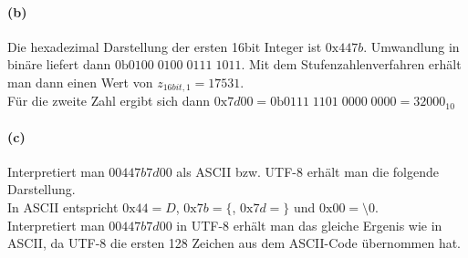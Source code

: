 \documentclass[a4paper]{article}
\begin{document}
\paragraph{(b)}
Die hexadezimal Darstellung der ersten 16bit Integer ist $0\text{x}447b$. Umwandlung in binäre liefert dann $0\text{b}0100\;0100\;0111\;1011$. Mit dem Stufenzahlenverfahren erhält man dann einen Wert von $z_{16bit,1}=17531$.\\
Für die zweite Zahl ergibt sich dann $0\text{x}7d00=0\text{b}0111\;1101\;0000\;0000=32000_{10}$


\paragraph{(c)}
Interpretiert man $0\text{0}447b7d00$ als ASCII bzw. UTF-8 erhält man die folgende Darstellung.\\
In ASCII entspricht $0\text{x}44=D$, $0\text{x}7b=\{$, $0\text{x}7d=\}$ und $0\text{x}00=\text{\textbackslash}0$.\\
Interpretiert man $0\text{0}447b7d00$ in UTF-8 erhält man das gleiche Ergenis wie in ASCII, da UTF-8 die ersten 128 Zeichen aus dem ASCII-Code übernommen hat.
\end{document}
